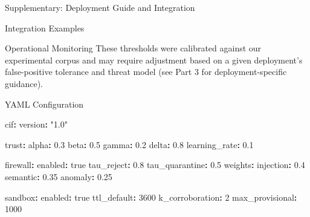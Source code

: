 \documentclass[
  ignorenonframetext,
]{beamer}
\newenvironment{Shaded}{}{}
\newcommand{\AttributeTok}[1]{\textcolor[rgb]{0.49,0.56,0.16}{#1}}
\newcommand{\CharTok}[1]{\textcolor[rgb]{0.25,0.44,0.63}{#1}}
\newcommand{\DecValTok}[1]{\textcolor[rgb]{0.25,0.63,0.44}{#1}}
\newcommand{\FloatTok}[1]{\textcolor[rgb]{0.25,0.63,0.44}{#1}}
\newcommand{\FunctionTok}[1]{\textcolor[rgb]{0.02,0.16,0.49}{#1}}
\newcommand{\KeywordTok}[1]{\textcolor[rgb]{0.00,0.44,0.13}{\textbf{#1}}}
\newcommand{\StringTok}[1]{\textcolor[rgb]{0.25,0.44,0.63}{#1}}
\begin{document}
\begin{frame}[fragile]{Supplementary: Deployment Guide and Integration}
\begin{block}{Integration Examples}
\begin{block}{Operational Monitoring}
These thresholds were calibrated against our experimental corpus and may
require adjustment based on a given deployment's false-positive
tolerance and threat model (see Part 3 for deployment-specific
guidance).
\end{block}

\begin{block}{YAML Configuration}
\protect{}\label{sec:yaml-config}
\begin{Shaded}
\begin{Highlighting}[]
\FunctionTok{cif}\KeywordTok{:}
\AttributeTok{  }\FunctionTok{version}\KeywordTok{:}\AttributeTok{ }\StringTok{"1.0"}

\AttributeTok{  }\FunctionTok{trust}\KeywordTok{:}
\AttributeTok{    }\FunctionTok{alpha}\KeywordTok{:}\AttributeTok{ }\FloatTok{0.3}
\AttributeTok{    }\FunctionTok{beta}\KeywordTok{:}\AttributeTok{ }\FloatTok{0.5}
\AttributeTok{    }\FunctionTok{gamma}\KeywordTok{:}\AttributeTok{ }\FloatTok{0.2}
\AttributeTok{    }\FunctionTok{delta}\KeywordTok{:}\AttributeTok{ }\FloatTok{0.8}
\AttributeTok{    }\FunctionTok{learning\_rate}\KeywordTok{:}\AttributeTok{ }\FloatTok{0.1}

\AttributeTok{  }\FunctionTok{firewall}\KeywordTok{:}
\AttributeTok{    }\FunctionTok{enabled}\KeywordTok{:}\AttributeTok{ }\CharTok{true}
\AttributeTok{    }\FunctionTok{tau\_reject}\KeywordTok{:}\AttributeTok{ }\FloatTok{0.8}
\AttributeTok{    }\FunctionTok{tau\_quarantine}\KeywordTok{:}\AttributeTok{ }\FloatTok{0.5}
\AttributeTok{    }\FunctionTok{weights}\KeywordTok{:}
\AttributeTok{      }\FunctionTok{injection}\KeywordTok{:}\AttributeTok{ }\FloatTok{0.4}
\AttributeTok{      }\FunctionTok{semantic}\KeywordTok{:}\AttributeTok{ }\FloatTok{0.35}
\AttributeTok{      }\FunctionTok{anomaly}\KeywordTok{:}\AttributeTok{ }\FloatTok{0.25}

\AttributeTok{  }\FunctionTok{sandbox}\KeywordTok{:}
\AttributeTok{    }\FunctionTok{enabled}\KeywordTok{:}\AttributeTok{ }\CharTok{true}
\AttributeTok{    }\FunctionTok{ttl\_default}\KeywordTok{:}\AttributeTok{ }\DecValTok{3600}
\AttributeTok{    }\FunctionTok{k\_corroboration}\KeywordTok{:}\AttributeTok{ }\DecValTok{2}
\AttributeTok{    }\FunctionTok{max\_provisional}\KeywordTok{:}\AttributeTok{ }\DecValTok{1000}


\end{Highlighting}
\end{Shaded}
\end{block}
\end{block}
\end{frame}
\end{document}
